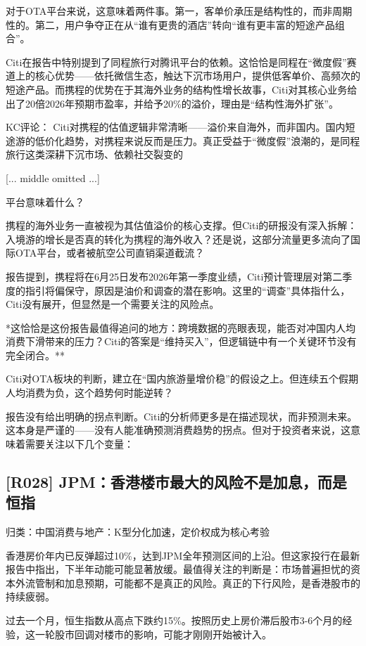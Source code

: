 \documentclass[11pt]{ctexart}
\begin{document}
对于OTA平台来说，这意味着两件事。第一，客单价承压是结构性的，而非周期性的。第二，用户争夺正在从“谁有更贵的酒店”转向“谁有更丰富的短途产品组合”。

Citi在报告中特别提到了同程旅行对腾讯平台的依赖。这恰恰是同程在“微度假”赛道上的核心优势——依托微信生态，触达下沉市场用户，提供低客单价、高频次的短途产品。而携程的优势在于其海外业务的结构性增长故事，Citi对其核心业务给出了20倍2026年预期市盈率，并给予20\%的溢价，理由是“结构性海外扩张”。

KC评论： Citi对携程的估值逻辑非常清晰——溢价来自海外，而非国内。国内短途游的低价化趋势，对携程来说反而是压力。真正受益于“微度假”浪潮的，是同程旅行这类深耕下沉市场、依赖社交裂变的

[... middle omitted ...]

平台意味着什么？

携程的海外业务一直被视为其估值溢价的核心支撑。但Citi的研报没有深入拆解：入境游的增长是否真的转化为携程的海外收入？还是说，这部分流量更多流向了国际OTA平台，或者被航空公司直销渠道截流？

报告提到，携程将在6月25日发布2026年第一季度业绩，Citi预计管理层对第二季度的指引将偏保守，原因是油价和调查的潜在影响。这里的“调查”具体指什么，Citi没有展开，但显然是一个需要关注的风险点。

*这恰恰是这份报告最值得追问的地方：跨境数据的亮眼表现，能否对冲国内人均消费下滑带来的压力？Citi的答案是“维持买入”，但逻辑链中有一个关键环节没有完全闭合。**

Citi对OTA板块的判断，建立在“国内旅游量增价稳”的假设之上。但连续五个假期人均消费为负，这个趋势何时能逆转？

报告没有给出明确的拐点判断。Citi的分析师更多是在描述现状，而非预测未来。这本身是严谨的——没有人能准确预测消费趋势的拐点。但对于投资者来说，这意味着需要关注以下几个变量：

\subsection{[R028] JPM：香港楼市最大的风险不是加息，而是恒指}
{\small\color{refgray}归类：中国消费与地产：K型分化加速，定价权成为核心考验}

香港房价年内已反弹超过10\%，达到JPM全年预测区间的上沿。但这家投行在最新报告中指出，下半年动能可能显著放缓。最值得关注的判断是：市场普遍担忧的资本外流管制和加息预期，可能都不是真正的风险。真正的下行风险，是香港股市的持续疲弱。

过去一个月，恒生指数从高点下跌约15\%。按照历史上房价滞后股市3-6个月的经验，这一轮股市回调对楼市的影响，可能才刚刚开始被计入。
\end{document}
